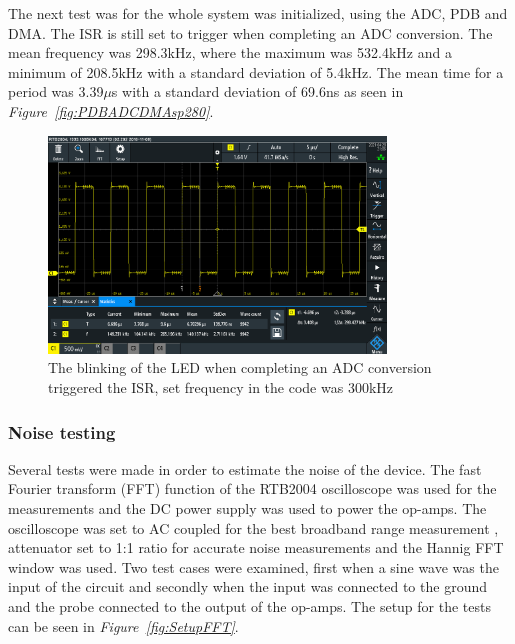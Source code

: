 The next test was for the whole system was initialized, using the ADC, PDB and DMA.
The ISR is still set to trigger when completing an ADC conversion.
The mean frequency was 298.3kHz, where the maximum was 532.4kHz and a minimum of 208.5kHz with a standard deviation of 5.4kHz. 
The mean time for a period was 3.39$\mu$s with a standard deviation of 69.6ns as seen in \textit{Figure~\ref{fig:PDBADCDMAsp280}}.

\begin{figure}[h]
    \centering
    \includegraphics[width=0.8\textwidth]{graphics/ALLT300k.PNG}
    \caption{The blinking of the LED when completing an ADC conversion triggered the ISR, set frequency in the code was 300kHz}
    \label{fig:PDBADCDMAsp300}
\end{figure}





\subsubsection{Noise testing}


Several tests were made in order to estimate the noise of the device.
The fast Fourier transform (FFT) function of the RTB2004 oscilloscope was used for the measurements and the DC power supply was used to power the op-amps.
The oscilloscope was set to AC coupled for the best broadband range measurement%
, attenuator set to 1:1 ratio %
for accurate noise measurements and the Hannig FFT window was used.
Two test cases were examined, first when a sine wave was the input of the circuit and secondly when the input was connected to the ground and the probe connected to the output of the op-amps.
The setup for the tests can be seen in \textit{Figure~\ref{fig:SetupFFT}}.

